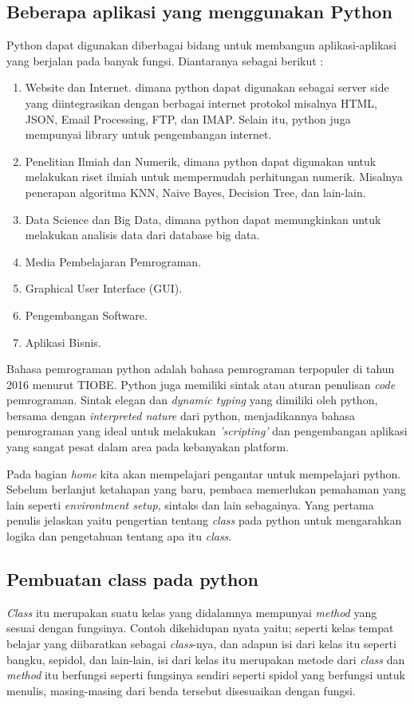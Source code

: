 \subsection{Beberapa aplikasi yang menggunakan Python}
Python dapat digunakan diberbagai bidang untuk membangun aplikasi-aplikasi yang berjalan pada banyak fungsi. Diantaranya sebagai berikut :
\begin{enumerate}
\item Website dan Internet. dimana python dapat digunakan sebagai server side yang diintegrasikan dengan berbagai internet protokol misalnya HTML, JSON, Email Processing, FTP, dan IMAP. Selain itu, python juga mempunyai library untuk pengembangan internet.
\item Penelitian Ilmiah dan Numerik, dimana python dapat digunakan untuk melakukan riset ilmiah untuk mempermudah perhitungan numerik. Misalnya penerapan algoritma KNN, Naive Bayes, Decision Tree, dan lain-lain.
\item Data Science dan Big Data, dimana python dapat memungkinkan untuk melakukan analisis data dari database big data.
\item Media Pembelajaran Pemrograman.
\item Graphical User Interface (GUI).
\item Pengembangan Software.
\item Aplikasi Bisnis.
\end{enumerate}

Bahasa pemrograman python adalah bahasa pemrograman terpopuler di tahun 2016 menurut TIOBE. Python juga memiliki sintak atau aturan penulisan \textit{code} pemrograman. Sintak elegan dan \textit{dynamic typing} yang dimiliki oleh python, bersama dengan \textit{interpreted nature} dari python, menjadikannya bahasa pemrograman yang ideal untuk melakukan \textit{'scripting'} dan pengembangan aplikasi yang sangat pesat dalam area pada kebanyakan platform.

Pada bagian \textit{home} kita akan mempelajari pengantar untuk mempelajari python. Sebelum berlanjut ketahapan yang baru, pembaca memerlukan pemahaman yang lain seperti \textit{environtment setup}, sintaks dan lain sebagainya. Yang pertama penulis jelaskan yaitu pengertian tentang \textit{class} pada python untuk mengarahkan logika dan pengetahuan tentang apa itu \textit{class}.

\subsection{Pembuatan class pada python}
\textit{Class} itu merupakan suatu kelas yang didalamnya mempunyai \textit{method} yang sesuai dengan fungsinya. Contoh dikehidupan nyata yaitu; seperti kelas tempat belajar yang diibaratkan sebagai \textit{class}-nya, dan adapun isi dari kelas itu seperti bangku, sepidol, dan lain-lain, isi dari kelas itu merupakan metode dari \textit{class} dan \textit{method} itu berfungsi seperti fungsinya sendiri seperti spidol yang berfungsi untuk menulis, masing-masing dari benda tersebut disesuaikan dengan fungsi.

